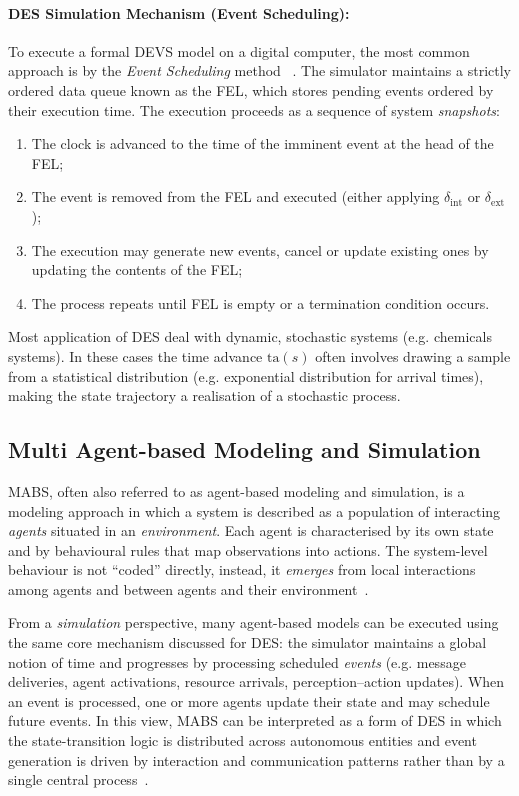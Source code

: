 \paragraph{DES Simulation Mechanism (Event
	Scheduling):}\label{par:des_event_scheduling} To execute a formal DEVS model on
a digital computer, the most common approach is by the \emph{Event Scheduling}
method ~\cite{BanksDESS10}. The simulator maintains a strictly ordered data
queue known as the \ac{FEL}, which stores pending events ordered by their
execution time. The execution proceeds as a sequence of system
\emph{snapshots}:
%
\begin{enumerate}
	\item The clock is advanced to the time of the imminent event at the head
	      of the \ac{FEL};
	\item The event is removed from the \ac{FEL} and executed (either applying
	      $\delta_{\text{int}}$ or $\delta_{\text{ext}}$);
	\item The execution may generate new events, cancel or update existing ones
	      by updating the contents of the \ac{FEL};
	\item The process repeats until \ac{FEL} is empty or a termination
	      condition occurs.
\end{enumerate}
%
Most application of \ac{DES} deal with dynamic, stochastic systems (e.g.
chemicals systems). In these cases the time advance $\text{ta}(s)$ often
involves drawing a sample from a statistical distribution (e.g. exponential
distribution for arrival times), making the state trajectory a realisation of a
stochastic process.

\subsection{Multi Agent-based Modeling and Simulation}\label{ssec:mabs}

\ac{MABS}, often also referred to as agent-based modeling and simulation, is a
modeling approach in which a system is described as a population of interacting
\emph{agents} situated in an \emph{environment}. Each agent is characterised by
its own state and by behavioural rules that map observations into actions. The
system-level behaviour is not ``coded'' directly, instead, it \emph{emerges}
from local interactions among agents and between agents and their
environment~\cite{MacalNorth2010ABMS,Bonabeau2002ABM}.

From a \emph{simulation} perspective, many agent-based models can be executed
using the same core mechanism discussed for \ac{DES}: the simulator maintains a
global notion of time and progresses by processing scheduled \emph{events}
(e.g. message deliveries, agent activations, resource arrivals,
perception--action updates). When an event is processed, one or more agents
update their state and may schedule future events. In this view, \ac{MABS} can
be interpreted as a form of \ac{DES} in which the state-transition logic is
distributed across autonomous entities and event generation is driven by
interaction and communication patterns rather than by a single central
process~\cite{MacalNorth2010ABMS,Byrd2019ABIDES}.

